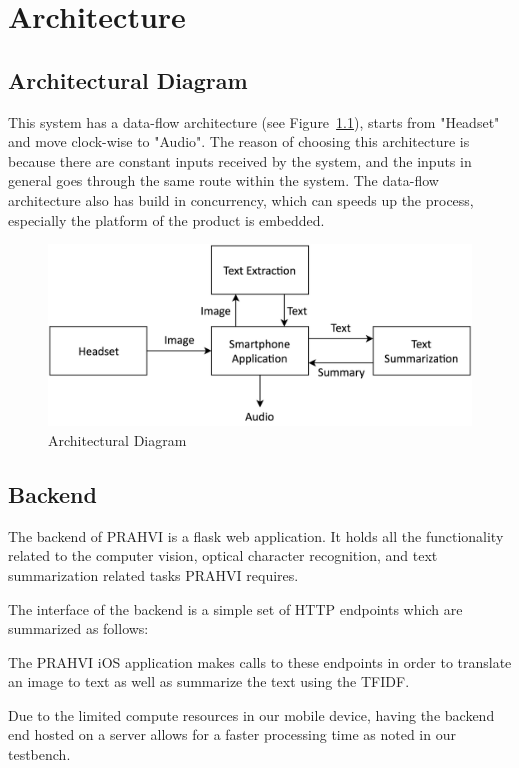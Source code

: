 \chapter{Architecture}
\section{Architectural Diagram}
This system has a data-flow architecture (see Figure~\ref{architectualDiagram}), starts from "Headset" and move clock-wise to "Audio". The reason of choosing this architecture is because there are constant inputs received by the system, and the inputs in general goes through the same route within the system. The data-flow architecture also has build in concurrency, which can speeds up the process, especially the platform of the product is embedded.
\begin{figure}
	\centering
    \includegraphics[scale = 0.2]{ArchitectureDiagram.png}
    
    \caption{Architectural Diagram}
	\label{architectualDiagram}
\end{figure}


\section{Backend}
The backend of PRAHVI is a flask web application. It holds all the functionality related to the computer vision, optical character recognition, and text summarization related tasks PRAHVI requires.

The interface of the backend is a simple set of HTTP endpoints which are summarized as follows:


The PRAHVI iOS application makes calls to these endpoints in order to translate an image to text as well as summarize the text using the TFIDF.

Due to the limited compute resources in our mobile device, having the backend end hosted on a server allows for a faster processing time as noted in our testbench.


